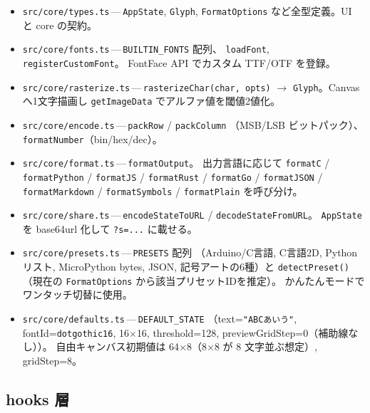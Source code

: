 \begin{itemize}[leftmargin=*,itemsep=2pt]
  \item \texttt{src/core/types.ts}\,---\,\texttt{AppState}, \texttt{Glyph},
        \texttt{FormatOptions} など全型定義。UI と core の契約。
  \item \texttt{src/core/fonts.ts}\,---\,\texttt{BUILTIN\_FONTS} 配列、
        \texttt{loadFont}, \texttt{registerCustomFont}。
        FontFace API でカスタム TTF/OTF を登録。
  \item \texttt{src/core/rasterize.ts}\,---\,\texttt{rasterizeChar(char, opts)}
        $\rightarrow$ \texttt{Glyph}。Canvas へ1文字描画し
        \texttt{getImageData} でアルファ値を閾値2値化。
  \item \texttt{src/core/encode.ts}\,---\,\texttt{packRow} / \texttt{packColumn}
        （MSB/LSB ビットパック）、\texttt{formatNumber}（bin/hex/dec）。
  \item \texttt{src/core/format.ts}\,---\,\texttt{formatOutput}。
        出力言語に応じて \texttt{formatC} / \texttt{formatPython}
        / \texttt{formatJS} / \texttt{formatRust} / \texttt{formatGo}
        / \texttt{formatJSON} / \texttt{formatMarkdown}
        / \texttt{formatSymbols} / \texttt{formatPlain} を呼び分け。
  \item \texttt{src/core/share.ts}\,---\,\texttt{encodeStateToURL}
        / \texttt{decodeStateFromURL}。
        \texttt{AppState} を base64url 化して \texttt{?s=...} に載せる。
  \item \texttt{src/core/presets.ts}\,---\,\texttt{PRESETS} 配列
        （Arduino/C言語, C言語2D, Python リスト, MicroPython bytes,
        JSON, 記号アートの6種）と \texttt{detectPreset()}
        （現在の \texttt{FormatOptions} から該当プリセットIDを推定）。
        かんたんモードでワンタッチ切替に使用。
  \item \texttt{src/core/defaults.ts}\,---\,\texttt{DEFAULT\_STATE}
        （text=\texttt{"ABCあいう"}, fontId=\texttt{dotgothic16},
        16$\times$16, threshold=128,
        previewGridStep=0（補助線なし））。
        自由キャンバス初期値は 64$\times$8（8$\times$8 が 8 文字並ぶ想定）,
        gridStep=8。
\end{itemize}

\subsection{hooks 層}

